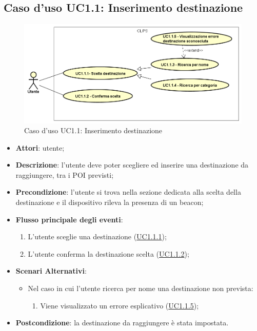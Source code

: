 \documentclass[../AnalisiDeiRequisiti.tex]{subfiles}
\begin{document}
\subsection{Caso d'uso UC1.1: Inserimento destinazione}

        \begin{figure}[!h]
            \centering
            \includegraphics[scale=0.95, width=\textwidth]{img/UC1-1.png}
            \caption{Caso d'uso UC1.1: Inserimento destinazione}\label{fig:UC1.1} 
        \end{figure}
\begin{itemize}
\item \textbf{Attori}: utente;
\item \textbf{Descrizione}: l'utente deve poter scegliere ed inserire una destinazione da raggiungere, tra i POI previsti; 
      \item \textbf{Precondizione}: l'utente si trova nella sezione dedicata alla scelta della destinazione e il dispositivo rileva la presenza di un beacon;

        \item \textbf{Flusso principale degli eventi}:
          \begin{enumerate}
          \item L'utente sceglie una destinazione  (\hyperlink{UC1.1.1}{UC1.1.1});
          \item L'utente conferma la destinazione scelta  (\hyperlink{UC1.1.2}{UC1.1.2});

      \end{enumerate}

    \item \textbf{Scenari Alternativi}:
    	\begin{itemize}
    		\item Nel caso in cui l'utente ricerca per nome una destinazione non prevista:
      		\begin{enumerate}
          		\item Viene visualizzato un errore esplicativo (\hyperlink{UC1.1.5}{UC1.1.5});
      		\end{enumerate}
      	\end{itemize}
    \item \textbf{Postcondizione}: la destinazione da raggiungere è stata impostata.
  \end{itemize}
\hypertarget{UC1.1.1}{}
\end{document}
